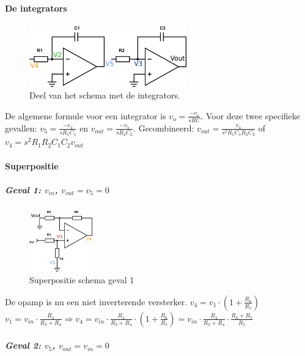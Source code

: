 \documentclass[a4paper,]{article}
\let\oldparagraph\paragraph
\renewcommand{\paragraph}[1]{\oldparagraph{#1}\mbox{}}
\let\oldsubparagraph\subparagraph
\renewcommand{\subparagraph}[1]{\oldsubparagraph{#1}\mbox{}}
\begin{document}
\hypertarget{de-integrators}{%
\paragraph{De integrators}\label{de-integrators}}

\begin{figure}
\centering
\includegraphics[width=\textwidth,height=1.04167in]{assets/integrators.png}
\caption{Deel van het schema met de integrators.}
\end{figure}

De algemene formule voor een integrator is \(v_o=\frac{-v_1}{sRC}\).
Voor deze twee specifieke gevallen: \(v_5=\frac{-v_4}{sR_1C_1}\) en
\(v_{out} = \frac{-v_5}{sR_2C_2}\). Gecombineerd:
\(v_{out}=\frac{v_4}{s^2R_1C_1R_2C_2}\) of
\(v_4 = s^2R_1R_2C_1C_2v_{out}\)

\hypertarget{superpositie}{%
\paragraph{Superpositie}\label{superpositie}}

\hypertarget{geval-1-v_in-v_out-v_5-0}{%
\subparagraph{\texorpdfstring{Geval 1: \(v_{in}\),
\(v_{out} = v_5 = 0\)}{Geval 1: v\_\{in\}, v\_\{out\} = v\_5 = 0}}\label{geval-1-v_in-v_out-v_5-0}}

\begin{figure}
\centering
\includegraphics[width=\textwidth,height=1.04167in]{assets/superpositie1.png}
\caption{Superpositie schema geval 1}
\end{figure}

De opamp is nu een niet inverterende versterker.
\(v_4 = v_1 \cdot (1+\frac{R_6}{R_5})\)
\(v_1 = v_{in} \cdot \frac{R_4}{R_3+R_4} \Rightarrow v_4 = v_{in} \cdot \frac{R_4}{R_3+R_4} \cdot (1+\frac{R_6}{R_5}) = v_{in} \cdot \frac{R_4}{R_3+R_4} \cdot \frac{R_6+R_5}{R_5}\)

\hypertarget{geval-2-v_5-v_out-v_in-0}{%
\subparagraph{\texorpdfstring{Geval 2: \(v_5\),
\(v_{out} = v_{in} = 0\)}{Geval 2: v\_5, v\_\{out\} = v\_\{in\} = 0}}\label{geval-2-v_5-v_out-v_in-0}}
\end{document}
